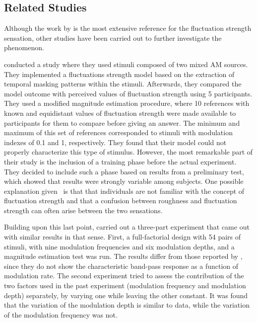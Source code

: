 \documentclass[../main.tex]{subfiles}
\begin{document}
\begin{theoreticalbackground}
\subsection{Related Studies}

Although the work by \citeauthor{Fastl2007Psychoacoustics} is the most extensive
reference for the fluctuation strength sensation, other studies have been
carried out to further investigate the phenomenon.

\textcite{Accolti2009Fluctuation} conducted a study where they used stimuli
composed of two mixed \gls{AM} sources. They implemented a fluctuations strength
model based on the extraction of temporal masking patterns within the stimuli.
Afterwards, they compared the model outcome with perceived values of
fluctuation strength using 5 participants. They used a modified magnitude
estimation procedure, where 10 references with known and equidistant values of
fluctuation strength were made available to participants for them to compare
before giving an answer. The minimum and maximum of this set of references
corresponded to stimuli with modulation indexes of 0.1 and 1, respectively. They
found that their model could not properly characterize this type of stimulus.
However, the most remarkable part of their study is the inclusion of a training
phase before the actual experiment. They decided to include such a phase based
on results from a preliminary test, which showed that results were strongly
variable among subjects. One possible explanation
given~\cite[pp.~17]{Accolti2009Fluctuation} is that that individuals are not
familiar with the concept of fluctuation strength and that a confusion between
roughness and fluctuation strength can often arise between the two sensations.

Building upon this last point, \citeauthor{Wickelmaier2004Scaling} carried out
a three-part experiment that came out with similar results in that sense. First,
a full-factorial design with 54 pairs of stimuli, with nine modulation
frequencies and six modulation depths, and a magnitude estimation test was run.
The results differ from those reported by \citeauthor{Fastl2007Psychoacoustics},
since they do not show the characteristic band-pass response as a function of
modulation rate. The second experiment tried to assess the contribution of the
two factors used in the past experiment (modulation frequency and modulation
depth) separately, by varying one while leaving the other constant. It was found
that the variation of the modulation depth is similar to
\citeauthor{Fastl2007Psychoacoustics} data, while the variation of the
modulation frequency was not.


\end{theoreticalbackground}
\end{document}

